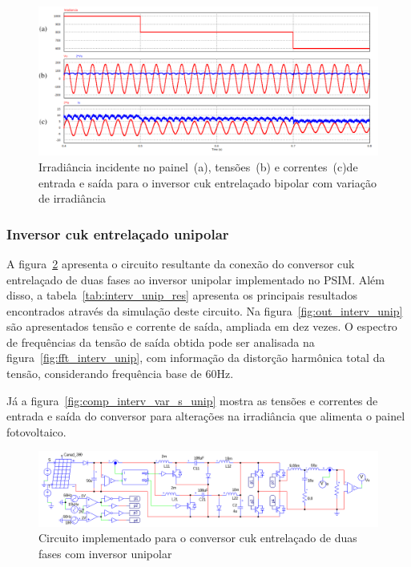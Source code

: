 \documentclass[
	12pt,				%
	openany,
	onseside,
	a4paper,			%
	english,			%
	french,				%
	spanish,			%
	brazil,				%
	]{abntex2}
\begin{document}
\begin{figure}[H]%
	\captionsetup{justification=centering}
	\centering
		\includegraphics[width= \linewidth]{comp_interv_var_s}
		\caption{Irradiância incidente no painel~(a), tensões~(b) e correntes~(c)de entrada e saída para o inversor cuk entrelaçado bipolar com variação de irradiância}
		\label{fig:comp_interv_var_s}
\end{figure}

\subsubsection{Inversor cuk entrelaçado unipolar}

A figura~\ref{fig:comp_interv_circ_clean_unip} apresenta o circuito resultante da conexão do conversor cuk entrelaçado de duas fases ao inversor unipolar implementado no PSIM. Além disso, a tabela~\ref{tab:interv_unip_res} apresenta os principais resultados encontrados através da simulação deste circuito. Na figura~\ref{fig:out_interv_unip} são apresentados tensão e corrente de saída, ampliada em dez vezes. O espectro de frequências da tensão de saída obtida pode ser analisada na figura~\ref{fig:fft_interv_unip},  com informação da distorção harmônica total da tensão, considerando frequência base de 60Hz.

Já a figura~\ref{fig:comp_interv_var_s_unip} mostra as tensões e correntes de entrada e saída do conversor para alterações na irradiância que alimenta o painel fotovoltaico.

\begin{figure}[H]%
	\captionsetup{justification=centering}
	\centering
		\includegraphics[width= \linewidth]{comp_interv_circ_clean_unip}
		\caption{Circuito implementado para o conversor cuk entrelaçado de duas fases com inversor unipolar}
		\label{fig:comp_interv_circ_clean_unip}
\end{figure}
\end{document}
